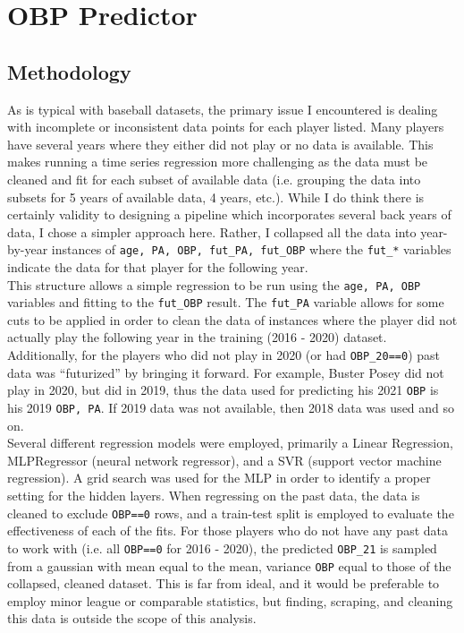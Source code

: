 \documentclass[paper=a4, fontsize=11pt]{scrartcl} %
\begin{document}
\section{ OBP Predictor }

\subsection{Methodology}

As is typical with baseball datasets, the primary issue I encountered is dealing with incomplete or inconsistent data points for each player listed. Many players have several years where they either did not play or no data is available. This makes running a time series regression more challenging as the data must be cleaned and fit for each subset of available data (i.e. grouping the data into subsets for 5 years of available data, 4 years, etc.). While I do think there is certainly validity to designing a pipeline which incorporates several back years of data, I chose a simpler approach here. Rather, I collapsed all the data into year-by-year instances of \verb|age, PA, OBP, fut_PA, fut_OBP| where the \verb|fut_*| variables indicate the data for that player for the following year. 
\\


This structure allows a simple regression to be run using the \verb|age, PA, OBP| variables and fitting to the \verb|fut_OBP| result. The \verb|fut_PA| variable allows for some cuts to be applied in order to clean the data of instances where the player did not actually play the following year in the training (2016 - 2020) dataset. Additionally, for the players who did not play in 2020 (or had \verb|OBP_20==0|) past data was ``futurized'' by bringing it forward. For example, Buster Posey did not play in 2020, but did in 2019, thus the data used for predicting his 2021 \verb|OBP| is his 2019 \verb|OBP, PA|. If 2019 data was not available, then 2018 data was used and so on.
\\


Several different regression models were employed, primarily a Linear Regression, MLPRegressor (neural network regressor), and a SVR (support vector machine regression). A grid search was used for the MLP in order to identify a proper setting for the hidden layers. When regressing on the past data, the data is cleaned to exclude \verb|OBP==0| rows, and a train-test split is employed to evaluate the effectiveness of each of the fits. For those players who do not have any past data to work with (i.e. all \verb|OBP==0| for 2016 - 2020), the predicted \verb|OBP_21| is sampled from a gaussian with mean equal to the mean, variance \verb|OBP| equal to those of the collapsed, cleaned dataset. This is far from ideal, and it would be preferable to employ minor league or comparable statistics, but finding, scraping, and cleaning this data is outside the scope of this analysis. 
\end{document}
